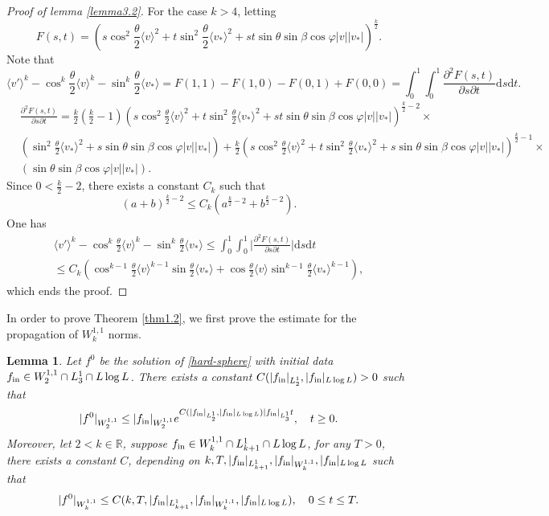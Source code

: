 \documentclass[reqno,10pt]{amsart}
\let\pa=\partial
\let\vf=\varphi
\def\pa{\partial}
\def\th{\theta}
\newcommand{\ben}{\begin{eqnarray}}
\newcommand{\een}{\end{eqnarray}}
\newcommand{\beno}{\begin{eqnarray*}}
\newcommand{\eeno}{\end{eqnarray*}}
\newtheorem{lem}{Lemma}[section]
\theoremstyle{definition}
\numberwithin{equation}{section}
\begin{document}
\begin{proof}[Proof of lemma \ref{lemma3.2}]
    For the case $k>4$, letting
    $$F(s,t)=(s\cos^2\frac{\th}{2}\langle v\rangle^2+t\sin^2\frac{\th}{2}\langle v_*\rangle^{2}+st\sin\th\sin\beta\cos\vf|v||v_*|)^{\frac{k}{2}}.$$
    Note that
    $$
    \langle v'\rangle^k-\cos^k\frac{\th}{2}\langle v\rangle^k-\sin^k\frac{\th}{2}\langle v_*\rangle=F(1,1)-F(1,0)-F(0,1)+F(0,0)
    =\int_0^1\int_0^1 \frac{\pa^2F(s,t)}{\pa s\pa t}\mathrm{d}s\mathrm{d}t.$$
    $$
    \begin{aligned}
    &\frac{\pa^2F(s,t)}{\pa s\pa t}=\frac{k}{2}(\frac{k}{2}-1)(s\cos^2\frac{\th}{2}\langle v\rangle^2+t\sin^2\frac{\th}{2}\langle v_*\rangle^{2}+st\sin\th\sin\beta\cos\vf|v||v_*|)^{\frac{k}{2}-2}\times\\
    & (\sin^2\frac{\th}{2}\langle v_*\rangle^2+s\sin\th\sin\beta\cos\varphi|v||v_*|)+\frac{k}{2}(s\cos^2\frac{\th}{2}\langle v\rangle^2+t\sin^2\frac{\th}{2}\langle v_*\rangle^{2}+s\sin\th\sin\beta\cos\vf|v||v_*|)^{\frac{k}{2}-1}\times\\
    &(\sin\th\sin\beta\cos\vf|v||v_*|).
    \end{aligned}
    $$
    Since $0< \frac{k}{2}-2$, there exists a constant $C_k$ such that
    $$(a+b)^{\frac{k}{2}-2}\le C_k (a^{\frac{k}{2}-2}+b^{\frac{k}{2}-2}).$$
    One has
    \beno
     \langle v'\rangle^k-\cos^k\frac{\th}{2}\langle v\rangle^k-\sin^k\frac{\th}{2}\langle v_*\rangle\le \int_0^1\int_0^1 \Big|\frac{\pa^2F(s,t)}{\pa s\pa t}\Big|\mathrm{d}s\mathrm{d}t \\ \le C_k(\cos^{k-1}\frac{\th}{2}\langle v\rangle^{k-1}\sin\frac{\th}{2}\langle v_*\rangle+\cos\frac{\th}{2}\langle v\rangle\sin^{k-1}\frac{\th}{2}\langle v_*\rangle^{k-1}),
    \eeno
   which ends the proof.
\end{proof}
In order to prove Theorem \ref{thm1.2}, we first prove the estimate for the propagation of $W^{1,1}_{k}$ norms.
\begin{lem}\label{lemma3.3}
Let $f^0$ be the solution of \eqref{hard-sphere} with initial data $f_{\textup{in}}\in W^{1,1}_2\cap L^1_{3}\cap L\log L$. 
    There exists  a constant $C(|f_{\textup{in}}|_{L^1_2},|f_{\textup{in}}|_{L\log L})>0$ such that
    \ben\label{3.3}
|f^0|_{W^{1,1}_2}\le |f_{\textup{in}}|_{W^{1,1}_2}e^{C(|f_{\textup{in}}|_{L^1_2},|f_{\textup{in}}|_{L\log L})|f_{\textup{in}}|_{L^1_3} t},\quad t\ge0.
    \een
    Moreover, let $2< k\in\mathbb{R}$, suppose $f_{\textup{in}}\in W^{1,1}_{k}\cap L^1_{k+1}\cap L\log L$,
    for any $T>0$, there exists a constant $C$, depending on $k,T,|f_{\textup{in}}|_{L^1_{k+1}},|f_{\textup{in}}|_{W^{1,1}_{k}},|f_{\textup{in}}|_{L\log L}$ such that
    \beno
|f^0|_{W^{1,1}_{k}}\le C(k,T,|f_{\textup{in}}|_{L^1_{k+1}},|f_{\textup{in}}|_{W^{1,1}_{k}},|f_{\textup{in}}|_{L\log L}),\quad 0\le t\le T.
    \eeno
\end{lem}
\end{document}
